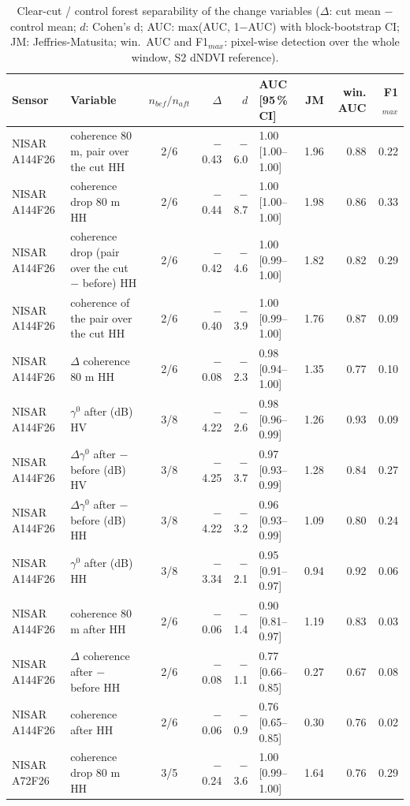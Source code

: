 \begin{table}[htbp]
\centering
\scriptsize
\caption{Clear-cut / control forest separability of the change variables ($\Delta$: cut mean $-$ control mean; $d$: Cohen's d; AUC: max(AUC, 1$-$AUC) with block-bootstrap CI; JM: Jeffries-Matusita; win.\ AUC and F1$_{max}$: pixel-wise detection over the whole window, S2 dNDVI reference).}
\label{tab-separability}
\begin{tabular}{llcrrlrrr}
\toprule
Sensor & Variable & $n_{bef}/n_{aft}$ & $\Delta$ & $d$ & AUC [95\,\% CI] & JM & win. AUC & F1$_{max}$ \\
\midrule
NISAR A144F26 & coherence 80 m, pair over the cut HH & 2/6 & $-$0.43 & $-$6.0 & 1.00 [1.00--1.00] & 1.96 & 0.88 & 0.22 \\
NISAR A144F26 & coherence drop 80 m HH & 2/6 & $-$0.44 & $-$8.7 & 1.00 [1.00--1.00] & 1.98 & 0.86 & 0.33 \\
NISAR A144F26 & coherence drop (pair over the cut $-$ before) HH & 2/6 & $-$0.42 & $-$4.6 & 1.00 [0.99--1.00] & 1.82 & 0.82 & 0.29 \\
NISAR A144F26 & coherence of the pair over the cut HH & 2/6 & $-$0.40 & $-$3.9 & 1.00 [0.99--1.00] & 1.76 & 0.87 & 0.09 \\
NISAR A144F26 & $\Delta$ coherence 80 m HH & 2/6 & $-$0.08 & $-$2.3 & 0.98 [0.94--1.00] & 1.35 & 0.77 & 0.10 \\
NISAR A144F26 & $\gamma^0$ after (dB) HV & 3/8 & $-$4.22 & $-$2.6 & 0.98 [0.96--0.99] & 1.26 & 0.93 & 0.09 \\
NISAR A144F26 & $\Delta\gamma^0$ after $-$ before (dB) HV & 3/8 & $-$4.25 & $-$3.7 & 0.97 [0.93--0.99] & 1.28 & 0.84 & 0.27 \\
NISAR A144F26 & $\Delta\gamma^0$ after $-$ before (dB) HH & 3/8 & $-$4.22 & $-$3.2 & 0.96 [0.93--0.99] & 1.09 & 0.80 & 0.24 \\
NISAR A144F26 & $\gamma^0$ after (dB) HH & 3/8 & $-$3.34 & $-$2.1 & 0.95 [0.91--0.97] & 0.94 & 0.92 & 0.06 \\
NISAR A144F26 & coherence 80 m after HH & 2/6 & $-$0.06 & $-$1.4 & 0.90 [0.81--0.97] & 1.19 & 0.83 & 0.03 \\
NISAR A144F26 & $\Delta$ coherence after $-$ before HH & 2/6 & $-$0.08 & $-$1.1 & 0.77 [0.66--0.85] & 0.27 & 0.67 & 0.08 \\
NISAR A144F26 & coherence after HH & 2/6 & $-$0.06 & $-$0.9 & 0.76 [0.65--0.85] & 0.30 & 0.76 & 0.02 \\
\addlinespace
NISAR A72F26 & coherence drop 80 m HH & 3/5 & $-$0.24 & $-$3.6 & 1.00 [0.99--1.00] & 1.64 & 0.76 & 0.29 \\

\end{tabular}
\end{table}
